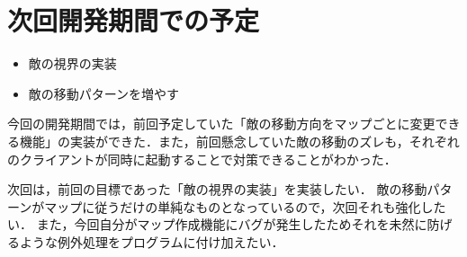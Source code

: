 \documentclass{jarticle}
\begin{document}
\section{次回開発期間での予定}
\begin{itemize}
\item 敵の視界の実装
\item 敵の移動パターンを増やす
\end{itemize}

今回の開発期間では，前回予定していた「敵の移動方向をマップごとに変更できる機能」の実装ができた．また，前回懸念していた敵の移動のズレも，それぞれのクライアントが同時に起動することで対策できることがわかった．

次回は，前回の目標であった「敵の視界の実装」を実装したい．
敵の移動パターンがマップに従うだけの単純なものとなっているので，次回それも強化したい．
また，今回自分がマップ作成機能にバグが発生したためそれを未然に防げるような例外処理をプログラムに付け加えたい．
\end{document}
